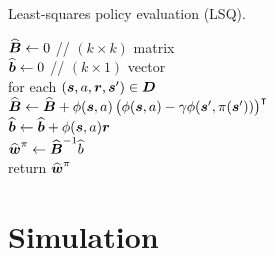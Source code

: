 \begin{algorithm}[H]
	\caption{Least-squares policy evaluation (LSQ).~\cite{Lagoudakis2003,Lagoudakis2001}}
	\BlankLine
	\BlankLine
	$\widehat{\boldsymbol{B}} \leftarrow 0$ \hspace{25pt} // $(k\times k)$ matrix\\
	$\widehat{\boldsymbol{b}} \leftarrow 0$ \hspace{28pt} // $(k\times 1)$ vector\\
	for each $(\boldsymbol{s}, a, \boldsymbol{r}, \boldsymbol{s}^{\prime}) \in \boldsymbol{D}$\\
	\hspace{25pt} $\widehat{\boldsymbol{B}} \leftarrow \widehat{\boldsymbol{B}} + \phi(\boldsymbol{s}, a)\left(\phi(\boldsymbol{s}, a) - \gamma\phi(\boldsymbol{s}^{\prime}, \pi(\boldsymbol{s}^{\prime}))\right)^{\intercal}$ \\
	\hspace{25pt} $\widehat{\boldsymbol{b}} \leftarrow
	\widehat{\boldsymbol{b}} + \phi(\boldsymbol{s}, a)\boldsymbol{r}$\\
	$\widehat{\boldsymbol{w}}^{\pi} \leftarrow \widehat{\boldsymbol{B}}^{-1}\widehat{b}$\\
	return $\widehat{\boldsymbol{w}}^{\pi}$
\end{algorithm} 

\section{Simulation}
